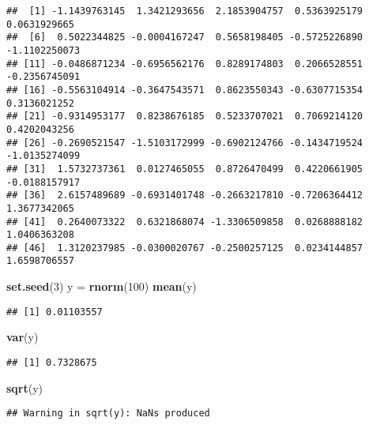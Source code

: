 \documentclass[]{article}
\newenvironment{Shaded}{\begin{snugshade}}{\end{snugshade}}
\newcommand{\KeywordTok}[1]{\textcolor[rgb]{0.13,0.29,0.53}{\textbf{#1}}}
\newcommand{\DecValTok}[1]{\textcolor[rgb]{0.00,0.00,0.81}{#1}}
\newcommand{\StringTok}[1]{\textcolor[rgb]{0.31,0.60,0.02}{#1}}
\newcommand{\NormalTok}[1]{#1}
\begin{document}
\begin{verbatim}
##  [1] -1.1439763145  1.3421293656  2.1853904757  0.5363925179  0.0631929665
##  [6]  0.5022344825 -0.0004167247  0.5658198405 -0.5725226890 -1.1102250073
## [11] -0.0486871234 -0.6956562176  0.8289174803  0.2066528551 -0.2356745091
## [16] -0.5563104914 -0.3647543571  0.8623550343 -0.6307715354  0.3136021252
## [21] -0.9314953177  0.8238676185  0.5233707021  0.7069214120  0.4202043256
## [26] -0.2690521547 -1.5103172999 -0.6902124766 -0.1434719524 -1.0135274099
## [31]  1.5732737361  0.0127465055  0.8726470499  0.4220661905 -0.0188157917
## [36]  2.6157489689 -0.6931401748 -0.2663217810 -0.7206364412  1.3677342065
## [41]  0.2640073322  0.6321868074 -1.3306509858  0.0268888182  1.0406363208
## [46]  1.3120237985 -0.0300020767 -0.2500257125  0.0234144857  1.6598706557
\end{verbatim}

\begin{Shaded}
\begin{Highlighting}[]
\KeywordTok{set.seed}\NormalTok{(}\DecValTok{3}\NormalTok{)}
\NormalTok{y =}\StringTok{ }\KeywordTok{rnorm}\NormalTok{(}\DecValTok{100}\NormalTok{)}
\KeywordTok{mean}\NormalTok{(y)}
\end{Highlighting}
\end{Shaded}

\begin{verbatim}
## [1] 0.01103557
\end{verbatim}

\begin{Shaded}
\begin{Highlighting}[]
\KeywordTok{var}\NormalTok{(y)}
\end{Highlighting}
\end{Shaded}

\begin{verbatim}
## [1] 0.7328675
\end{verbatim}

\begin{Shaded}
\begin{Highlighting}[]
\KeywordTok{sqrt}\NormalTok{(y)}
\end{Highlighting}
\end{Shaded}

\begin{verbatim}
## Warning in sqrt(y): NaNs produced
\end{verbatim}
\end{document}
